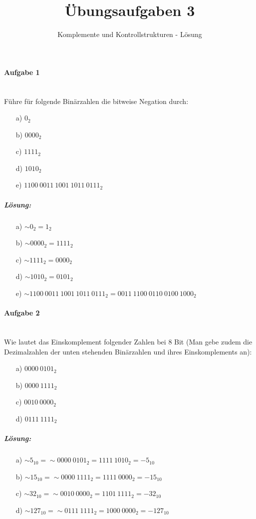 \documentclass[12pt,a4paper,ngerman]{scrartcl}
\title{Übungsaufgaben 3}
\subtitle{Komplemente und Kontrollstrukturen - Lösung}
\date{}
\begin{document}
	\maketitle
	
	\paragraph{Aufgabe 1}\mbox{}\\
	Führe für folgende Binärzahlen die bitweise Negation durch:
	\begin{itemize}
		\item[a)] $0_2$
		\item[b)] $0000_2$
		\item[c)] $1111_2$
		\item[d)] $1010_2$
		\item[e)] $1100\ 0011\ 1001\ 1011\ 0111_2$
	\end{itemize}

	\subparagraph{Lösung:} 
	\begin{itemize}
		\item[a)] $\sim 0_2 = 1_2$
		\item[b)] $\sim 0000_2 = 1111_2$
		\item[c)] $\sim 1111_2 = 0000_2$
		\item[d)] $\sim 1010_2 = 0101_2$
		\item[e)] $\sim 1100\ 0011\ 1001\ 1011\ 0111_2 = 0011\ 1100\ 0110\ 0100\ 1000_2$
	\end{itemize}
	
	\paragraph{Aufgabe 2}\mbox{}\\
	Wie lautet das Einskomplement folgender Zahlen bei 8 Bit (Man gebe zudem die Dezimalzahlen der unten stehenden Binärzahlen und ihres Einskomplements an):
	\begin{itemize}
		\item[a)] $0000\ 0101_2$
		\item[b)] $0000\ 1111_2$
		\item[c)] $0010\ 0000_2$
		\item[d)] $0111\ 1111_2$
	\end{itemize}

	\subparagraph{Lösung:} 
	\begin{itemize}
		\item[a)] $\sim 5_{10} = \sim 0000\ 0101_2 = 1111\ 1010_2 = -5_{10}$
		\item[b)] $\sim 15_{10} = \sim 0000\ 1111_2 = 1111\ 0000_2 = -15_{10}$
		\item[c)] $\sim 32_{10} = \sim 0010\ 0000_2 = 1101\ 1111_2 = -32_{10}$
		\item[d)] $\sim 127_{10} = \sim 0111\ 1111_2 = 1000\ 0000_2 = -127_{10}$
	\end{itemize}
	
\end{document}
